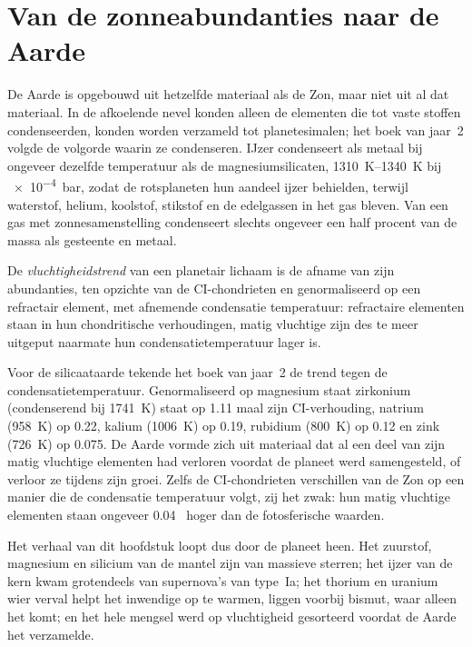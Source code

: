 \section{Van de zonneabundanties naar de Aarde}\label{sec:b3:origin-of-elements:earth}

De Aarde is opgebouwd uit hetzelfde materiaal als de Zon, maar niet uit al dat
materiaal. In de afkoelende nevel konden alleen de elementen die tot vaste
stoffen condenseerden, konden worden verzameld tot planetesimalen; het boek van jaar~2 volgde de
volgorde waarin ze condenseren. IJzer condenseert als metaal bij ongeveer dezelfde
temperatuur als de magnesiumsilicaten, \qtyrange{1310}{1340}{K} bij
\qty{e-4}{bar}, zodat de rotsplaneten hun aandeel ijzer behielden, terwijl
waterstof, helium, koolstof, stikstof en de edelgassen in het gas bleven.
Van een gas met zonnesamenstelling condenseert slechts ongeveer een half procent
van de massa als gesteente en metaal.

\begin{definition}[Vluchtigheidstrend]\label{def:b3:origin-of-elements:volatility}
De \emph{vluchtigheidstrend} van een planetair lichaam
is de afname van zijn abundanties, ten opzichte van de CI-chondrieten en
genormaliseerd op een refractair element, met afnemende condensatie
temperatuur: refractaire elementen staan in hun chondritische verhoudingen, matig vluchtige
zijn des te meer uitgeput naarmate hun
condensatietemperatuur lager is.
\end{definition}

Voor de silicaataarde tekende het boek van jaar~2 de trend tegen de
condensatietemperatuur. Genormaliseerd op magnesium staat zirkonium
(condenserend bij \qty{1741}{K}) staat op \num{1.11} maal zijn
CI-verhouding, natrium (\qty{958}{K}) op \num{0.22}, kalium
(\qty{1006}{K}) op \num{0.19}, rubidium (\qty{800}{K}) op \num{0.12}
en zink (\qty{726}{K}) op \num{0.075}. De Aarde vormde zich uit materiaal dat
al een deel van zijn matig vluchtige elementen had verloren voordat
de planeet werd samengesteld, of verloor ze tijdens zijn groei. Zelfs de
CI-chondrieten verschillen van de Zon op een manier die de condensatie
temperatuur volgt, zij het zwak: hun matig vluchtige elementen staan
ongeveer \num{0.04}~ hoger dan de fotosferische waarden.

Het verhaal van dit hoofdstuk loopt dus door de planeet heen. Het zuurstof,
magnesium en silicium van de mantel zijn  van massieve
sterren; het ijzer van de kern kwam grotendeels van supernova's van type~Ia;
het thorium en uranium wier verval helpt het inwendige op te warmen, liggen voorbij
bismut, waar alleen het  komt; en het hele mengsel werd
op vluchtigheid gesorteerd voordat de Aarde het verzamelde.

